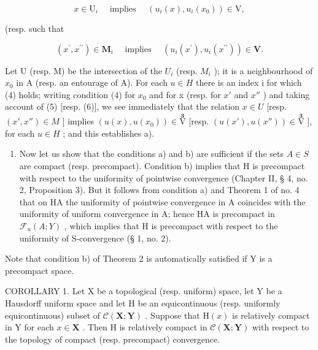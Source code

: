 \[
x \in \mathrm{U} _ {i} \quad \text { implies } \quad (u _ {i} (x), u _ {i} (x _ {0})) \in \mathrm{V},\tag{5}
\]

(resp. such that

\[
(x ^ {\prime}, x ^ {\prime \prime}) \in \mathbf {M} _ {i} \quad \text { implies } \quad (u _ {i} (x ^ {\prime}), u _ {i} (x ^ {\prime \prime})) \in \mathbf {V}.\tag{6}
\]

Let U (resp. M) be the intersection of the \(U_{i}\) (resp. \(M_{i}\) ); it is a neighbourhood of \(x_{0}\) in A (resp. an entourage of A). For each \(u \in H\) there is an index i for which (4) holds; writing condition (4) for \(x_{0}\) and for x (resp. for \(x'\) and \(x''\) ) and taking account of (5) {[}resp. (6){]}, we see immediately that the relation \(x \in U\) {[}resp. \((x', x'') \in M\) {]} implies \((u(x), u(x_{0})) \in \overset{\mathbf{3}}{\mathrm{V}}\) {[}resp. \((u(x'), u(x'')) \in \overset{\mathbf{3}}{\mathrm{V}}\) {]}, for each \(u \in H\) ; and this establishes a).

\begin{enumerate}
\def\labelenumi{\arabic{enumi})}
\setcounter{enumi}{1}
\tightlist
\item
  Now let us show that the conditions a) and b) are sufficient if the sets \(A \in S\) are compact (resp. precompact). Condition b) implies that H is precompact with respect to the uniformity of pointwise convergence (Chapter II, § 4, no. 2, Proposition 3). But it follows from condition a) and Theorem 1 of no. 4 that on H\textbar A the uniformity of pointwise convergence in A coincides with the uniformity of uniform convergence in A; hence H\textbar A is precompact in \(\mathcal{F}_{u}(A; Y)\) , which implies that H is precompact with respect to the uniformity of S-convergence (§ 1, no. 2).
\end{enumerate}

Note that condition b) of Theorem 2 is automatically satisfied if Y is a precompact space.

COROLLARY 1. Let X be a topological (resp. uniform) space, let Y be a Hausdorff uniform space and let H be an equicontinuous (resp. uniformly equicontinuous) subset of \(\mathcal{C}(\mathbf{X};\mathbf{Y})\) . Suppose that \(\mathrm{H}(x)\) is relatively compact in Y for each \(x\in \mathbf{X}\) . Then H is relatively compact in \(\mathcal{C}(\mathbf{X};\mathbf{Y})\) with respect to the topology of compact (resp. precompact) convergence.

